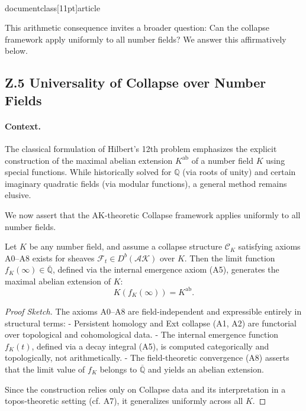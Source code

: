 \\documentclass[11pt]{article}
\begin{document}
This arithmetic consequence invites a broader question:  
Can the collapse framework apply uniformly to all number fields?  
We answer this affirmatively below.


\subsection*{Z.5 Universality of Collapse over Number Fields}

\paragraph{Context.}
The classical formulation of Hilbert's 12th problem emphasizes the explicit construction of the maximal abelian extension \( K^{\mathrm{ab}} \) of a number field \( K \) using special functions.  
While historically solved for \( \mathbb{Q} \) (via roots of unity) and certain imaginary quadratic fields (via modular functions), a general method remains elusive.

We now assert that the AK-theoretic Collapse framework applies uniformly to all number fields.

\begin{theorem}
Let \( K \) be any number field, and assume a collapse structure \( \mathcal{C}_K \) satisfying axioms A0–A8 exists for sheaves \( \mathcal{F}_t \in D^b(\mathcal{AK}) \) over \( K \).  
Then the limit function \( f_K(\infty) \in \overline{\mathbb{Q}} \), defined via the internal emergence axiom (A5),  
generates the maximal abelian extension of \( K \):
\[
K(f_K(\infty)) = K^{\mathrm{ab}}.
\]
\end{theorem}

\begin{proof}[Proof Sketch]
The axioms A0–A8 are field-independent and expressible entirely in structural terms:  
- Persistent homology and Ext collapse (A1, A2) are functorial over topological and cohomological data.
- The internal emergence function \( f_K(t) \), defined via a decay integral (A5), is computed categorically and topologically, not arithmetically.
- The field-theoretic convergence (A8) asserts that the limit value of \( f_K \) belongs to \( \overline{\mathbb{Q}} \) and yields an abelian extension.

Since the construction relies only on Collapse data and its interpretation in a topos-theoretic setting (cf. A7), it generalizes uniformly across all \( K \).
\end{proof}
\end{document}
